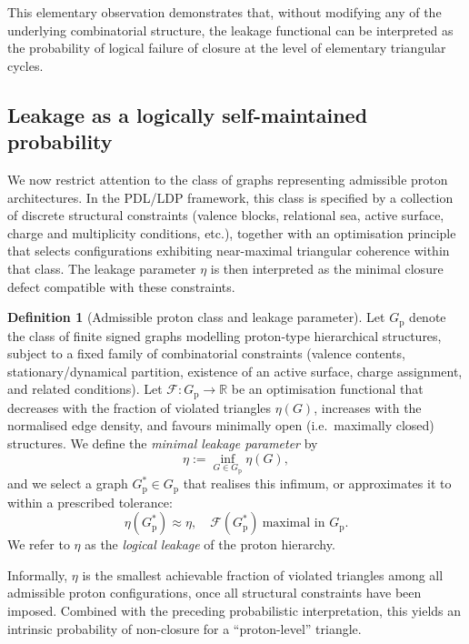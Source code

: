 \documentclass[11pt,a4paper]{article}
\theoremstyle{definition}
\newtheorem{definition}[theorem]{Definition}
\newcommand{\Gprot}{G_{\mathrm{p}}}
\newcommand{\etaL}{\eta} %
\newcommand{\Fopt}{\mathcal{F}} %
\begin{document}
This elementary observation demonstrates that, without modifying any of the underlying combinatorial structure, the leakage functional can be interpreted as the probability of logical failure of closure at the level of elementary triangular cycles.

\subsection{Leakage as a logically self-maintained probability}

We now restrict attention to the class of graphs representing admissible proton architectures. In the PDL/LDP framework, this class is specified by a collection of discrete structural constraints (valence blocks, relational sea, active surface, charge and multiplicity conditions, etc.), together with an optimisation principle that selects configurations exhibiting near-maximal triangular coherence within that class. The leakage parameter \(\etaL\) is then interpreted as the minimal closure defect compatible with these constraints.

\begin{definition}[Admissible proton class and leakage parameter]
Let \(\Gprot\) denote the class of finite signed graphs modelling proton-type hierarchical structures, subject to a fixed family of combinatorial constraints (valence contents, stationary/dynamical partition, existence of an active surface, charge assignment, and related conditions). Let \(\Fopt : \Gprot \to \mathbb{R}\) be an optimisation functional that decreases with the fraction of violated triangles \(\eta(G)\), increases with the normalised edge density, and favours minimally open (i.e.\ maximally closed) structures. We define the \emph{minimal leakage parameter} by
\[
 \etaL := \inf_{G \in \Gprot} \eta(G),
\]
and we select a graph \(G^\ast_{\mathrm{p}} \in \Gprot\) that realises this infimum, or approximates it to within a prescribed tolerance:
\[
 \eta(G^\ast_{\mathrm{p}}) \approx \etaL, \quad \Fopt(G^\ast_{\mathrm{p}}) \ \text{maximal in } \Gprot.
\]
We refer to \(\etaL\) as the \emph{logical leakage} of the proton hierarchy.
\end{definition}

Informally, \(\etaL\) is the smallest achievable fraction of violated triangles among all admissible proton configurations, once all structural constraints have been imposed. Combined with the preceding probabilistic interpretation, this yields an intrinsic probability of non-closure for a ``proton-level'' triangle.
\end{document}
